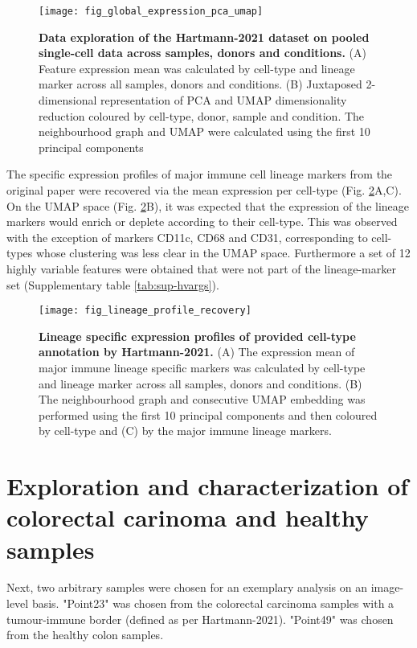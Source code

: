 \begin{figure}[p]
    \centering
    \texttt{[image: fig\_global\_expression\_pca\_umap]}
    \caption{\textbf{Data exploration of the Hartmann-2021 dataset on pooled single-cell data across samples, donors and conditions.} (A) Feature expression mean was calculated by cell-type and lineage marker across all samples, donors and conditions. (B) Juxtaposed 2-dimensional representation of PCA and UMAP dimensionality reduction coloured by cell-type, donor, sample and condition. The neighbourhood graph and UMAP  were calculated using the first 10 principal components}
    \label{fig:exploration}
\end{figure}


The specific expression profiles of major immune cell lineage markers from the original paper were recovered via the mean expression per cell-type (Fig. \ref{fig:lineage-recovery}A,C). On the UMAP space (Fig. \ref{fig:lineage-recovery}B), it was expected that the expression of the lineage markers would enrich or deplete according to their cell-type. This was observed with the exception of markers CD11c, CD68 and CD31, corresponding to cell-types whose clustering was less clear in the UMAP space. Furthermore a set of 12 highly variable features were obtained that were not part of the lineage-marker set (Supplementary table \ref{tab:sup-hvargs}).

\begin{figure}[h!]
    \centering
    \texttt{[image: fig\_lineage\_profile\_recovery]}
    \caption{\textbf{Lineage specific expression profiles of provided cell-type annotation by Hartmann-2021.} (A) The expression mean of major immune lineage specific markers was calculated by cell-type and lineage marker across all samples, donors and conditions. (B) The neighbourhood graph and consecutive UMAP embedding was performed using the first 10 principal components and then coloured by cell-type and (C) by the major immune lineage markers.}
    \label{fig:lineage-recovery}
\end{figure}

\pagebreak



\section{Exploration and characterization of colorectal carinoma and healthy samples}

Next, two arbitrary samples were chosen for an exemplary analysis on an image-level basis.  "Point23" was chosen from the colorectal carcinoma samples with a tumour-immune border (defined as per Hartmann-2021). "Point49" was chosen from the healthy colon samples.

